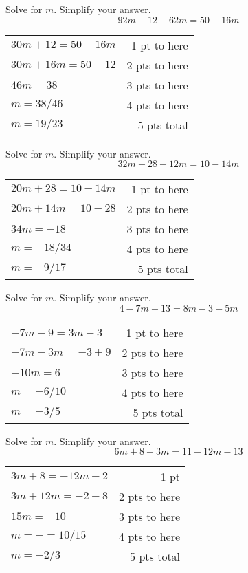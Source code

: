 {
	Solve for $m$. Simplify your answer. $$92m+12-62m=50-16m$$
}
{
	\begin{tabular}{l r}
	$30m+12=50-16m$ & 1 pt to here\\
	$30m+16m=50-12$ & 2 pts to here\\
	$46m=38$ & 3 pts to here\\
	$m=38/46$ & 4 pts to here\\
	$m=19/23$ & 5 pts total\\
	\end{tabular}
}

{
	Solve for $m$. Simplify your answer. $$32m+28-12m=10-14m$$
}
{
	\begin{tabular}{l r}
	$20m+28=10-14m$ & 1 pt to here\\
	$20m+14m=10-28$ & 2 pts to here\\
	$34m=-18$ & 3 pts to here\\
	$m=-18/34$  & 4 pts to here\\
	$m=-9/17$ & 5 pts total
	\end{tabular}
}

{
	Solve for $m$. Simplify your answer. $$4-7m-13=8m-3-5m$$
}
{
	\begin{tabular}{l r}
	$-7m-9=3m-3$ & 1 pt to here\\
	$-7m-3m=-3+9$ & 2 pts to here\\
	$-10m=6$ & 3 pts to here\\
	$m=-6/10$  & 4 pts to here\\
	$m=-3/5$& 5 pts total
	\end{tabular}
}

{
	Solve for $m$. Simplify your answer. $$6m+8-3m=11-12m-13$$
}
{
	\begin{tabular}{l r}
	$3m+8=-12m-2$ & 1 pt\\
	$3m+12m=-2-8$ & 2 pts to here\\
	$15m=-10$ & 3 pts to here\\
	$m=-=10/15$ & 4 pts to here\\
	$m=-2/3$ & 5 pts total
	\end{tabular}
}

